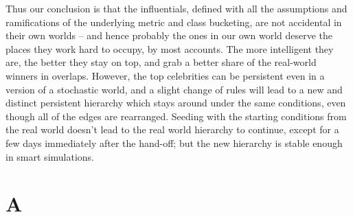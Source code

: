 \documentclass[10pt,oneside]{memoir}
\def\mybibliostyle{plain}
\def\bibliocommand{}
\begin{document}
Thus our conclusion is that the influentials, defined with all the assumptions and ramifications of the underlying metric and class bucketing, are not accidental in their own worlds -- and hence probably the ones in our own world deserve the places they work hard to occupy, by most accounts.  The more intelligent they are, the better they stay on top, and grab a better share of the real-world winners in overlaps.  However, the top celebrities can be persistent even in a version of a stochastic world, and a slight change of rules will lead to a new and distinct persistent hierarchy which stays around under the same conditions, even though all of the edges are rearranged.  Seeding with the starting conditions from the real world doesn't lead to the real world hierarchy to continue, except for a few days immediately after the hand-off; but the new hierarchy is stable enough in smart simulations.





\appendixpage
\appendix
\chapter{A}
\pagestyle{plain}


%
%

\backmatter


\bibliocommand

\printglossary


\printindex
\end{document}
